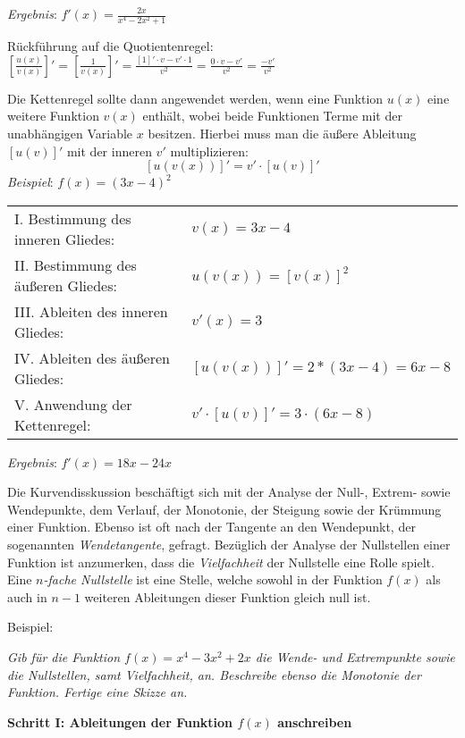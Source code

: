 \emph{Ergebnis}: $f'(x) = \frac{2x}{x^4 - 2x^2 + 1}$

R\"{u}ckf\"{u}hrung auf die Quotientenregel: \hspace{1cm} $\left[\frac{u(x)}{v(x)}\right]' = \left[\frac{1}{v(x)}\right]' = \frac{[1]' \cdot v - v' \cdot 1}{v^2} = \frac{0 \cdot v - v'}{v^2} = \frac{-v'}{v^2}$


Die Kettenregel sollte dann angewendet werden, wenn eine Funktion $u(x)$ eine weitere Funktion $v(x)$ enth\"{a}lt, wobei beide Funktionen Terme mit der unabh\"{a}ngigen Variable $x$ besitzen. Hierbei muss man die \"{a}u\ss{}ere Ableitung $[u(v)]'$ mit der inneren $v'$ multiplizieren: $$[u(v(x))]' = v' \cdot [u(v)]'$$
\emph{Beispiel}: $f(x) = (3x - 4)^2$

\begin{tabular}{l l}
	I. Bestimmung des inneren Gliedes: & $v(x) = 3x - 4$
	\extrapar \\
	II. Bestimmung des \"{a}u\ss{}eren Gliedes: & $u(v(x)) = [v(x)]^2$
	\extrapar \\
	III. Ableiten des inneren Gliedes: & $v'(x) = 3$
	\extrapar \\
	IV. Ableiten des \"{a}u\ss{}eren Gliedes: & $[u(v(x))]' = 2 * (3x - 4) = 6x - 8$
	\extrapar \\
	V. Anwendung der Kettenregel: & $v' \cdot [u(v)]' = 3 \cdot (6x - 8)$
\end{tabular}

\emph{Ergebnis}: $f'(x) = 18x - 24x$


Die Kurvendisskussion besch\"{a}ftigt sich mit der Analyse der Null-, Extrem- sowie Wendepunkte, dem Verlauf, der Monotonie, der Steigung sowie der Kr\"{u}mmung einer Funktion. Ebenso ist oft nach der Tangente an den Wendepunkt, der sogenannten \emph{Wendetangente}, gefragt. Bez\"{u}glich der Analyse der Nullstellen einer Funktion ist anzumerken, dass die \emph{Vielfachheit} der Nullstelle eine Rolle spielt. Eine \emph{$n$-fache Nullstelle} ist eine Stelle, welche sowohl in der Funktion $f(x)$ als auch in $n-1$ weiteren Ableitungen dieser Funktion gleich null ist. 

Beispiel:

\emph{Gib f\"{u}r die Funktion $f(x) = x^4 - 3x^2 + 2x$ die Wende- und Extrempunkte sowie die Nullstellen, samt Vielfachheit, an. Beschreibe ebenso die Monotonie der Funktion. Fertige eine Skizze an.}

\textbf{Schritt I: Ableitungen der Funktion $f(x)$ anschreiben}

